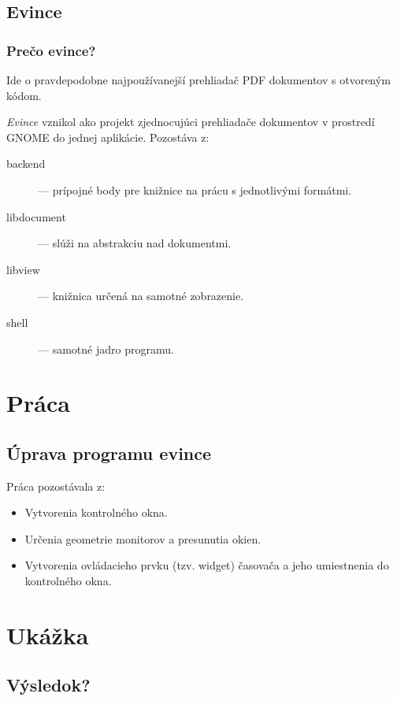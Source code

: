 \documentclass{beamer}
\begin{document}
\subsection{Evince}
\begin{frame}
\frametitle{Prečo evince?}
Ide o pravdepodobne najpoužívanejší prehliadač PDF dokumentov s otvoreným kódom.
\end{frame}
\begin{frame}
\emph{Evince} vznikol ako projekt zjednocujúci prehliadače dokumentov v prostredí GNOME do jednej aplikácie.
Pozostáva z:

\begin{description}
\item [backend] --- prípojné body pre knižnice na prácu s jednotlivými formátmi.
\item [libdocument] --- slúži na abstrakciu nad dokumentmi.
\item [libview] --- knižnica určená na samotné zobrazenie.
\item [shell] --- samotné jadro programu.
\end{description}

\end{frame}

\section{Práca}
\subsection{Úprava programu evince}
\begin{frame}
Práca pozostávala z:
\begin{itemize}
\item Vytvorenia kontrolného okna.
\item Určenia geometrie monitorov a presunutia okien.
\item Vytvorenia ovládacieho prvku (tzv. widget) časovača a jeho umiestnenia do kontrolného okna.
\end{itemize}
\end{frame}

\section{Ukážka}

\subsection{Výsledok?}
\end{document}
